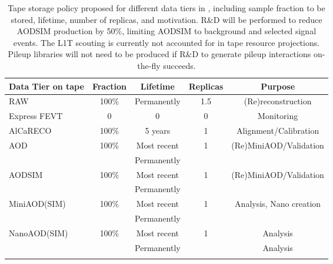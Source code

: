 \begin{table}[tbph]
    \centering
	\caption{Tape storage policy proposed for different data tiers in \RunFour, including sample fraction to be stored, lifetime, number of replicas, and motivation. R\&D will be performed to reduce AODSIM production by 50\%, limiting AODSIM to background and selected signal events. The \gls{L1T} scouting is currently not accounted for in tape resource projections. Pileup libraries will not need to be produced if R\&D to generate pileup interactions on-the-fly succeeds.}
    \begin{tabular}{|l|c|c|c|c|}
    \hline
    \rowcolor{tableheader} \hline
       Data Tier on tape   & Fraction    & Lifetime           & Replicas & Purpose                  \\ \hline
    \cellcolor{tablerowheader}
       RAW           & 100\%       & Permanently        & 1.5      & (Re)reconstruction  \\
    \cellcolor{tablerowheader}
    Express FEVT     & 0           & 0                  & 0        & Monitoring  \\
    \cellcolor{tablerowheader}
    AlCaRECO               & 100\%       & 5 years            & 1        & Alignment/Calibration   \\
    \cellcolor{tablerowheader}
    AOD              & 100\%       & Most recent        & 1        & (Re)MiniAOD/Validation  \\
    \cellcolor{tablerowheader}
                           &             & Permanently        &          & \\
    \cellcolor{tablerowheader}
        AODSIM             & 100\%       & Most recent        & 1        & (Re)MiniAOD/Validation   \\
    \cellcolor{tablerowheader}
                           &             & Permanently        &          & \\
    \cellcolor{tablerowheader}
        MiniAOD(SIM) & 100\%       & Most recent        & 1        & Analysis, Nano creation  \\
    \cellcolor{tablerowheader}
                           &             & Permanently        &          & \\
    \cellcolor{tablerowheader}
    NanoAOD(SIM)     & 100\%       & Most recent        & 1        & Analysis    \\ 
    \cellcolor{tablerowheader}
                           &             & Permanently        &          & Analysis                 \\ 
    \cellcolor{tablerowheader}

\end{tabular}
\end{table}
